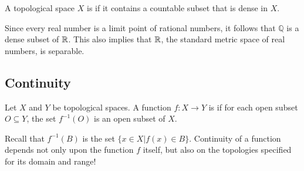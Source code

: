 \begin{definition}
A topological space $X$ is  if it contains a countable subset that is dense in $X$.
\end{definition}

\begin{example}
Since every real number is a limit point of rational numbers, it follows that $\mathbb{Q}$ is a dense subset of $\mathbb{R}$.
This also implies that $\mathbb{R}$, the standard metric space of real numbers, is separable.
\end{example}


\subsection{Continuity}

\begin{definition}
Let $X$ and $Y$ be topological spaces.
A function $f: X \rightarrow Y$ is  if for each open subset $O \subseteq Y$, the set $f^{-1} (O)$ is an open subset of $X$.
\end{definition}

Recall that $f^{-1}(B)$ is the set $\{ x \in X | f(x) \in B \}$.
Continuity of a function depends not only upon the function $f$ itself, but also on the topologies specified for its domain and range!

